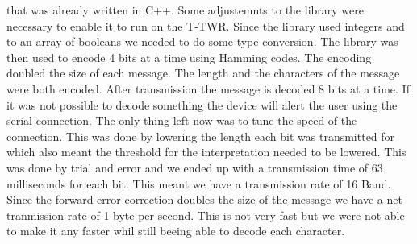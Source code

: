 that was already written in C++. Some adjustemnts to the library were necessary to enable it to run on the T-TWR. Since the library used integers and to an array of booleans we needed to do some type conversion. The library was then used to encode 4 bits at a time using Hamming codes. The encoding doubled the size of each message. The length and the characters of the message were both encoded. After transmission the message is decoded 8 bits at a time. If it was not possible to decode something the device will alert the user using the serial connection. The only thing left now was to tune the speed of the connection. This was done by lowering the length each bit was transmitted for which also meant the threshold for the interpretation needed to be lowered. This was done by trial and error and we ended up with a transmission time of 63 milliseconds for each bit. This meant we have a transmission rate of 16 Baud. Since the forward error correction doubles the size of the message we have a net tranmission rate of 1 byte per second. This is not very fast but we were not able to make it any faster whil still beeing able to decode each character.
